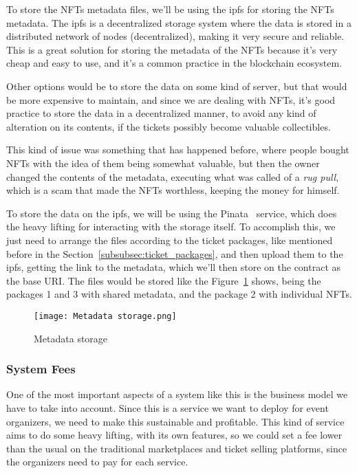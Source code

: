 To store the NFTs metadata files, we'll be using the \gls{ipfs} for storing the
NFTs metadata. The \gls{ipfs} is a decentralized storage system where the data
is stored in a distributed network of nodes (decentralized), making it very
secure and reliable. This is a great solution for storing the metadata of the
NFTs because it's very cheap and easy to use, and it's a common practice in the
blockchain ecosystem.

Other options would be to store the data on some kind of server, but that would
be more expensive to maintain, and since we are dealing with NFTs, it's good
practice to store the data in a decentralized manner, to avoid any kind of
alteration on its contents, if the tickets possibly become valuable
collectibles.

This kind of issue was something that has happened before, where people bought
NFTs with the idea of them being somewhat valuable, but then the owner changed
the contents of the metadata, executing what was called of a \textit{rug pull},
which is a scam that made the NFTs worthless, keeping the money for himself.

To store the data on the \gls{ipfs}, we will be using the Pinata~\cite{pinata}
service, which does the heavy lifting for interacting with the storage itself.
To accomplish this, we just need to arrange the files according to the ticket
packages, like mentioned before in the Section~\ref{subsubsec:ticket_packages},
and then upload them to the \gls{ipfs}, getting the link to the metadata, which
we'll then store on the contract as the base URI. The files would be stored
like the Figure~\ref{fig:metadata_storage} shows, being the packages 1 and 3
with shared metadata, and the package 2 with individual NFTs.

\begin{figure}[H]
	\texttt{[image: Metadata storage.png]}
	\centering
	\caption{Metadata storage}\label{fig:metadata_storage}
\end{figure}

\subsubsection{System Fees}\label{subsubsec:system_fees}

One of the most important aspects of a system like this is the business model
we have to take into account. Since this is a service we want to deploy for
event organizers, we need to make this sustainable and profitable. This kind of
service aims to do some heavy lifting, with its own features, so we could set a
fee lower than the usual on the traditional marketplaces and ticket selling
platforms, since the organizers need to pay for each service.

